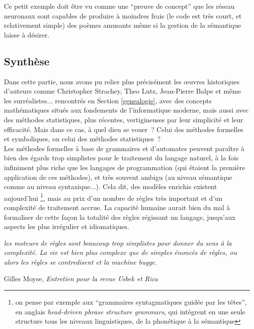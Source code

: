 \documentclass{article}
\newenvironment{citationbox}
{\begin{center}
		\begin{minipage}{.8\textwidth}
		}
		{
		\end{minipage}	
\end{center}
}
\begin{document}
					Ce petit exemple doit être vu comme une ``preuve de concept'' que les réseau neuronaux sont capables de produire à moindres frais (le code est très court, et relativement simple) des poèmes amusants même si la gestion de la sémantique laisse à désirer.
					
		\subsection{Synthèse}
			Dans cette partie, nous avons pu relier plus précisément les œuvres historiques d'auteurs comme Christopher Strachey, Theo Lutz, Jean-Pierre Balpe et même les surréalistes... rencontrés en Section \ref{genealogie}, avec des concepts mathématiques situés aux fondements de l'informatique moderne, mais aussi avec des méthodes statistiques, plus récentes, vertigineuses par leur simplicité et leur efficacité. Mais dans ce cas, à quel dieu se vouer~? Celui des méthodes formelles et symboliques, ou celui des méthodes statistiques~?\\
				
			Les méthodes formelles à base de grammaires et d'automates peuvent paraître à bien des égards trop simplistes pour le traitement du langage naturel, à la fois infiniment plus riche que les langages de programmation (qui étaient la première application de ces méthodes), et très souvent ambigu (au niveau sémantique comme au niveau syntaxique...). Cela dit, des modèles enrichis existent aujourd'hui \footnote{on pense par exemple aux ``grammaires syntagmatiques guidée par les têtes'', en anglais \textit{head-driven phrase structure grammars}, qui intègrent en une seule structure tous les niveaux linguistiques, de la phonétique à la sémantique}, mais au prix d'un nombre de règles très important et d'un complexité de traitement accrue. La capacité humaine aurait bien du mal à formaliser de cette façon la totalité des règles régissant un langage, jusqu'aux aspects les plus irrégulier et idiomatiques.
			
			\begin{citationbox}
				\textit{les moteurs de règles sont beaucoup trop simplistes pour donner du sens à la complexité. La vie est bien plus complexe que de simples énoncés de règles, ou alors les règles se contredisent et la machine bugge.}
				\begin{flushright}
					Gilles Moyse, \textit{Entretien pour la revue Usbek et Rica} \cite{edin2018}
				\end{flushright}
			\end{citationbox}
			
\end{document}
